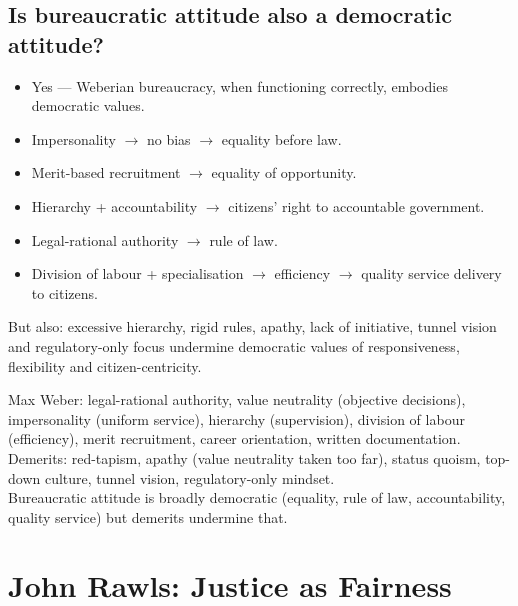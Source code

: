 \subsection*{Is bureaucratic attitude also a democratic attitude?}
\begin{KeyConcept}
\begin{itemize}
\item Yes --- Weberian bureaucracy, when functioning correctly, embodies democratic values.
\item Impersonality $\rightarrow$ no bias $\rightarrow$ equality before law.
\item Merit-based recruitment $\rightarrow$ equality of opportunity.
\item Hierarchy + accountability $\rightarrow$ citizens' right to accountable government.
\item Legal-rational authority $\rightarrow$ rule of law.
\item Division of labour + specialisation $\rightarrow$ efficiency $\rightarrow$ quality service delivery to citizens.
\end{itemize}
\end{KeyConcept}

\begin{CriticalPoint}
But also: excessive hierarchy, rigid rules, apathy, lack of initiative, tunnel vision and regulatory-only focus undermine democratic values of responsiveness, flexibility and citizen-centricity.
\end{CriticalPoint}

\begin{QuickRevision}
Max Weber: legal-rational authority, value neutrality (objective decisions), impersonality (uniform service), hierarchy (supervision), division of labour (efficiency), merit recruitment, career orientation, written documentation.\\
Demerits: red-tapism, apathy (value neutrality taken too far), status quoism, top-down culture, tunnel vision, regulatory-only mindset.\\
Bureaucratic attitude is broadly democratic (equality, rule of law, accountability, quality service) but demerits undermine that.
\end{QuickRevision}

\section{John Rawls: Justice as Fairness}

